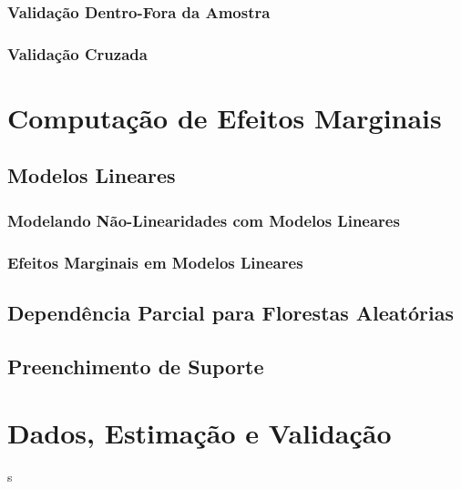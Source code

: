 \subsection{Validação Dentro-Fora da Amostra}
\subsection{Validação Cruzada}

\chapter{Computação de Efeitos Marginais}
\section{Modelos Lineares}
\subsection{Modelando Não-Linearidades com Modelos Lineares}
\subsection{Efeitos Marginais em Modelos Lineares}
\section{Dependência Parcial para Florestas Aleatórias}
\section{Preenchimento de Suporte}

\chapter{Dados, Estimação e Validação}s
